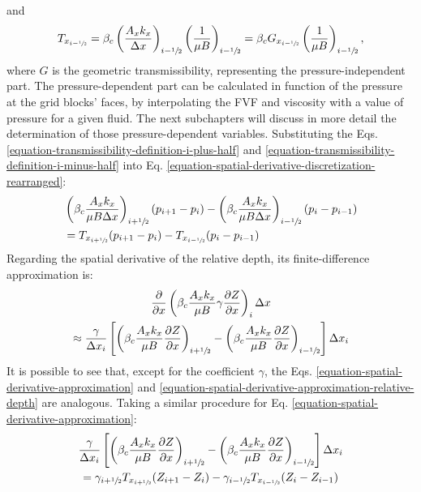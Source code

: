 %
and
%
\begin{align}
	\label{equation-transmissibility-splitted-i-minus-half}
	T_{x_{i-\sfrac{1}{2}}}=\beta_c\left(\frac{A_x k_x}{\Delta x}\right)_{i-\sfrac{1}{2}} \left(\frac{1}{\mu B}\right)_{i-\sfrac{1}{2}}=\beta_c G_{x_{i-\sfrac{1}{2}}} \left(\frac{1}{\mu B}\right)_{i-\sfrac{1}{2}} ,
\end{align}
%
where $G$ is the geometric transmissibility, representing the pressure-independent part.
%
The pressure-dependent part can be calculated in function of the pressure at the grid blocks' faces, by interpolating the FVF and viscosity with a value of pressure for a given fluid.
%
The next subchapters will discuss in more detail the determination of those pressure-dependent variables.
%
Substituting the Eqs. \ref{equation-transmissibility-definition-i-plus-half} and \ref{equation-transmissibility-definition-i-minus-half} into Eq. \ref{equation-spatial-derivative-discretization-rearranged}:
%
\begin{align}\nonumber
	\label{equation-spatial-derivative-discretization-transmissibility}
	&\left( \beta_c \frac{A_x k_x}{\mu B \Delta x}\right)_{i+\sfrac{1}{2}} (p_{i+1}-p_i) - \left( \beta_c \frac{A_x k_x}{\mu B \Delta x}\right)_{i-\sfrac{1}{2}} (p_i-p_{i-1})\\ &= T_{x_{i+\sfrac{1}{2}}} (p_{i+1}-p_i) - T_{x_{i-\sfrac{1}{2}}} (p_i-p_{i-1})
\end{align}
%
Regarding the spatial derivative of the relative depth, its finite-difference approximation is:
%
\begin{multline}
	\label{equation-spatial-derivative-approximation-relative-depth}
	\frac{\partial}{\partial x}\left( \beta_c \frac{A_x k_x}{\mu B}\gamma\frac{\partial Z}{\partial x}\right)_i \Delta x \\ \approx \frac{\gamma}{\Delta x_i} \left[ \left( \beta_c \frac{A_x k_x}{\mu B}\frac{\partial Z}{\partial x}\right)_{i+\sfrac{1}{2}} - \left( \beta_c \frac{A_x k_x}{\mu B}\frac{\partial Z}{\partial x}\right)_{i-\sfrac{1}{2}}\right] \Delta x_i
\end{multline}
%
It is possible to see that, except for the coefficient $\gamma$, the Eqs. \ref{equation-spatial-derivative-approximation} and \ref{equation-spatial-derivative-approximation-relative-depth} are analogous. Taking a similar procedure for Eq. \ref{equation-spatial-derivative-approximation}:
%
\begin{multline}
	\label{equation-spatial-derivative-discretization-transmissibility-relative-depth}
	\frac{\gamma}{\Delta x_i} \left[ \left( \beta_c \frac{A_x k_x}{\mu B}\frac{\partial Z}{\partial x}\right)_{i+\sfrac{1}{2}} - \left( \beta_c \frac{A_x k_x}{\mu B}\frac{\partial Z}{\partial x}\right)_{i-\sfrac{1}{2}}\right] \Delta x_i \\ =  \gamma_{i+\sfrac{1}{2}} T_{x_{i+\sfrac{1}{2}}} (Z_{i+1}-Z_i) - \gamma_{i-\sfrac{1}{2}} T_{x_{i-\sfrac{1}{2}}} (Z_i-Z_{i-1})
\end{multline}
